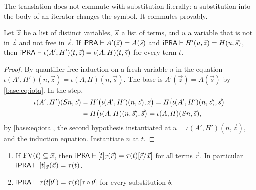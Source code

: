 The translation does not commute with substitution literally: a substitution
into the body of an iterator changes the symbol.  It commutes provably.

\begin{lemma}
\label{base:lem:iota-ext}
Let $\vec z$ be a list of distinct variables, $\vec s$ a list of terms, and
$u$ a variable that is not in $\vec z$ and not free in $\vec s$.  If
$\mathsf{iPRA}\vdash A'(\vec z)=A(\vec s)$ and
$\mathsf{iPRA}\vdash H'(u,\vec z)=H(u,\vec s)$, then
$\mathsf{iPRA}\vdash\iota(A',H')(t,\vec z)=\iota(A,H)(t,\vec s)$ for every term
$t$.
\end{lemma}

\begin{proof}
By quantifier-free induction on a fresh variable $n$ in the equation
$\iota(A',H')(n,\vec z)=\iota(A,H)(n,\vec s)$.  The base is
$A'(\vec z)=A(\vec s)$ by \eqref{base:eq:iota}.  In the step,
\begin{align*}
 \iota(A',H')(S n,\vec z)
 &=H'\bigl(\iota(A',H')(n,\vec z),\vec z\bigr)
  =H\bigl(\iota(A',H')(n,\vec z),\vec s\bigr)\\
 &=H\bigl(\iota(A,H)(n,\vec s),\vec s\bigr)=\iota(A,H)(S n,\vec s),
\end{align*}
by \eqref{base:eq:iota}, the second hypothesis instantiated at
$u=\iota(A',H')(n,\vec z)$, and the induction equation.  Instantiate $n$ at
$t$.
\end{proof}

\begin{lemma}
\label{base:lem:tau}
\begin{enumerate}[label=\textup{(\roman*)}]
\item If $\operatorname{FV}(t)\subseteq\vec x$, then
 $\mathsf{iPRA}\vdash[t]_{\vec x}(\vec r)=\tau(t)[\vec r/\vec x]$ for all
 terms $\vec r$.  In particular $\mathsf{iPRA}\vdash[t]_{\vec x}(\vec x)=\tau(t)$.
\item $\mathsf{iPRA}\vdash\tau(t[\theta])=\tau(t)[\tau\circ\theta]$ for every
 substitution $\theta$.
\end{enumerate}
\end{lemma}

